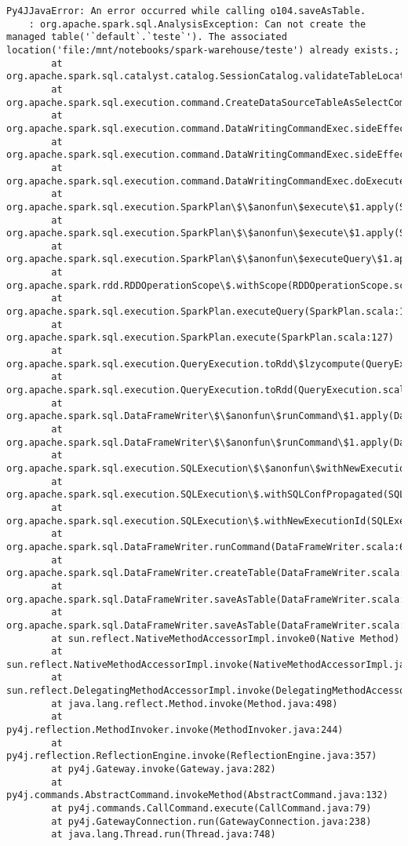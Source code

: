 \documentclass[11pt]{article}
\begin{document}
\begin{Verbatim}[commandchars=\\\{\}]
        Py4JJavaError: An error occurred while calling o104.saveAsTable.
    : org.apache.spark.sql.AnalysisException: Can not create the managed table('`default`.`teste`'). The associated location('file:/mnt/notebooks/spark-warehouse/teste') already exists.;
    	at org.apache.spark.sql.catalyst.catalog.SessionCatalog.validateTableLocation(SessionCatalog.scala:336)
    	at org.apache.spark.sql.execution.command.CreateDataSourceTableAsSelectCommand.run(createDataSourceTables.scala:170)
    	at org.apache.spark.sql.execution.command.DataWritingCommandExec.sideEffectResult\$lzycompute(commands.scala:104)
    	at org.apache.spark.sql.execution.command.DataWritingCommandExec.sideEffectResult(commands.scala:102)
    	at org.apache.spark.sql.execution.command.DataWritingCommandExec.doExecute(commands.scala:122)
    	at org.apache.spark.sql.execution.SparkPlan\$\$anonfun\$execute\$1.apply(SparkPlan.scala:131)
    	at org.apache.spark.sql.execution.SparkPlan\$\$anonfun\$execute\$1.apply(SparkPlan.scala:127)
    	at org.apache.spark.sql.execution.SparkPlan\$\$anonfun\$executeQuery\$1.apply(SparkPlan.scala:155)
    	at org.apache.spark.rdd.RDDOperationScope\$.withScope(RDDOperationScope.scala:151)
    	at org.apache.spark.sql.execution.SparkPlan.executeQuery(SparkPlan.scala:152)
    	at org.apache.spark.sql.execution.SparkPlan.execute(SparkPlan.scala:127)
    	at org.apache.spark.sql.execution.QueryExecution.toRdd\$lzycompute(QueryExecution.scala:80)
    	at org.apache.spark.sql.execution.QueryExecution.toRdd(QueryExecution.scala:80)
    	at org.apache.spark.sql.DataFrameWriter\$\$anonfun\$runCommand\$1.apply(DataFrameWriter.scala:668)
    	at org.apache.spark.sql.DataFrameWriter\$\$anonfun\$runCommand\$1.apply(DataFrameWriter.scala:668)
    	at org.apache.spark.sql.execution.SQLExecution\$\$anonfun\$withNewExecutionId\$1.apply(SQLExecution.scala:78)
    	at org.apache.spark.sql.execution.SQLExecution\$.withSQLConfPropagated(SQLExecution.scala:125)
    	at org.apache.spark.sql.execution.SQLExecution\$.withNewExecutionId(SQLExecution.scala:73)
    	at org.apache.spark.sql.DataFrameWriter.runCommand(DataFrameWriter.scala:668)
    	at org.apache.spark.sql.DataFrameWriter.createTable(DataFrameWriter.scala:465)
    	at org.apache.spark.sql.DataFrameWriter.saveAsTable(DataFrameWriter.scala:444)
    	at org.apache.spark.sql.DataFrameWriter.saveAsTable(DataFrameWriter.scala:400)
    	at sun.reflect.NativeMethodAccessorImpl.invoke0(Native Method)
    	at sun.reflect.NativeMethodAccessorImpl.invoke(NativeMethodAccessorImpl.java:62)
    	at sun.reflect.DelegatingMethodAccessorImpl.invoke(DelegatingMethodAccessorImpl.java:43)
    	at java.lang.reflect.Method.invoke(Method.java:498)
    	at py4j.reflection.MethodInvoker.invoke(MethodInvoker.java:244)
    	at py4j.reflection.ReflectionEngine.invoke(ReflectionEngine.java:357)
    	at py4j.Gateway.invoke(Gateway.java:282)
    	at py4j.commands.AbstractCommand.invokeMethod(AbstractCommand.java:132)
    	at py4j.commands.CallCommand.execute(CallCommand.java:79)
    	at py4j.GatewayConnection.run(GatewayConnection.java:238)
    	at java.lang.Thread.run(Thread.java:748)



\end{Verbatim}
\end{document}
